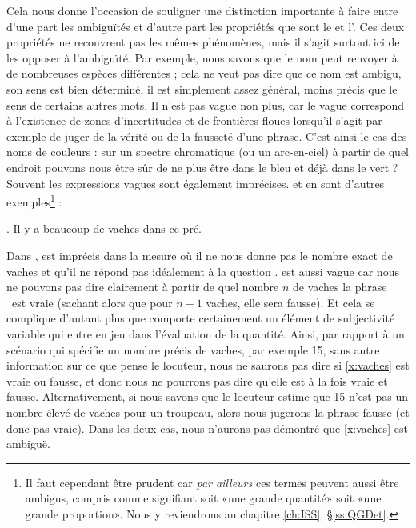 \begin{refsegment}
Cela nous donne l'occasion de souligner une distinction importante à faire entre d'une part les ambiguïtés et d'autre part les propriétés que sont le  et l'.  
Ces deux propriétés ne recouvrent pas les mêmes phénomènes, mais il s'agit surtout ici de les opposer à l'ambiguïté.
Par exemple, nous savons que le nom  peut renvoyer à de nombreuses espèces différentes ; cela ne veut pas dire que ce nom est ambigu, son sens est bien déterminé, il est simplement assez général, moins précis que le sens de certains autres mots. 
Il n'est pas vague non plus, car le vague correspond à l'existence de zones d'incertitudes et de frontières floues lorsqu'il s'agit par exemple de juger de la vérité ou de la fausseté d'une phrase.  C'est ainsi le cas des noms de couleurs : sur un spectre chromatique (ou un arc-en-ciel) à partir de quel endroit pouvons nous être sûr de ne plus être dans le bleu et déjà dans le vert ?
Souvent les expressions vagues sont également imprécises.   et  en sont d'autres exemples\footnote{Il faut cependant être prudent car \emph{par ailleurs} ces termes peuvent aussi être ambigus, compris comme signifiant soit «une grande quantité» soit «une grande proportion».  Nous y reviendrons au chapitre \ref{ch:ISS}, \S\ref{ss:QGDet}.} :

\ex.  \label{x:vaches}
Il y a beaucoup de vaches dans ce pré.


Dans \Last,  est imprécis dans la mesure où il ne nous donne pas le nombre exact de vaches et qu'il ne répond pas idéalement à la question .   est aussi vague car nous ne pouvons pas dire clairement à partir de quel nombre $n$ de vaches la phrase \Last\ est vraie (sachant alors que pour $n-1$ vaches, elle sera fausse).  
Et cela se complique d'autant plus que  comporte certainement un élément de subjectivité variable qui entre en jeu dans l'évaluation de la quantité. 
Ainsi, par rapport à un scénario qui spécifie un nombre précis de vaches, par exemple 15, sans autre information sur ce que pense le locuteur, nous ne saurons pas dire si \ref{x:vaches} est vraie ou fausse, et donc nous ne pourrons pas dire qu'elle est à la fois vraie et fausse.  
Alternativement, si nous savons que le locuteur estime que 15 n'est pas un nombre élevé de vaches pour un troupeau, alors nous jugerons la phrase fausse (et donc pas vraie).  Dans les deux cas, nous n'aurons pas  démontré que \ref{x:vaches} est ambiguë. 


\end{refsegment}
